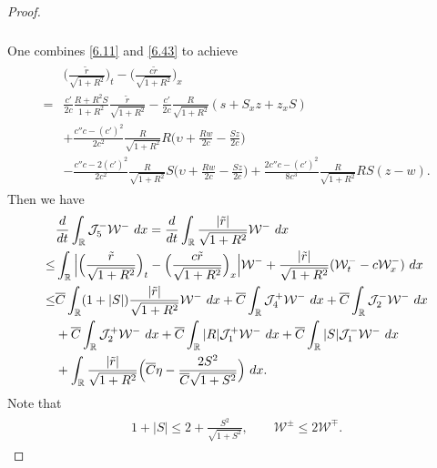 \documentclass[10pt,a4paper]{amsart}
\newcommand{\fr}{\frac}
\begin{document}
\begin{proof}
\begin{align}
\begin{split}
\end{split}
\end{align}
One combines \eqref{6.11} and \eqref{6.43} to achieve
\begin{align}\label{6.44}
\begin{split}
&\Big(\fr{\tilde{r}}{\sqrt{1+R^2}}\Big)_t-\Big(\fr{c\tilde{r}}{\sqrt{1+R^2}}\Big)_x \\
=&\fr{c'}{2c}\fr{R+R^2S}{1+R^2}\fr{\tilde{r}}{\sqrt{1+R^2}} -\fr{c'}{2c}\fr{R}{\sqrt{1+R^2}}(s +S_xz+z_xS ) \\ &+\fr{c''c-(c')^2}{2c^2}\fr{R}{\sqrt{1+R^2}}R\Big(\upsilon+\fr{Rw}{2c}-\fr{Sz}{2c}\Big) \\ &-\fr{c''c-2(c')^2}{2c^2}\fr{R}{\sqrt{1+R^2}}S\Big(\upsilon+\fr{Rw}{2c}-\fr{Sz}{2c}\Big) +\fr{2c''c-(c')^2}{8c^3}\fr{R}{\sqrt{1+R^2}}RS(z-w).
\end{split}
\end{align}
Then we have
\begin{align}\label{6.45}
\begin{split}
&\fr{{\rm d}}{{\rm d}t}\int_{\mathbb{R}} \mathcal{J}_{5}^-\mathcal{W}^-\ {\rm d}x=\fr{{\rm d}}{{\rm d}t}\int_{\mathbb{R}}\fr{|\tilde{r}|}{\sqrt{1+R^2}}\mathcal{W}^-\ {\rm d}x \\
\leq &\int_{\mathbb{R}}\Big|\Big(\fr{\tilde{r}}{\sqrt{1+R^2}}\Big)_t -\Big(\fr{c\tilde{r}}{\sqrt{1+R^2}}\Big)_x\Big|\mathcal{W}^- +\fr{|\tilde{r}|}{\sqrt{1+R^2}}(\mathcal{W}^{-}_t-c\mathcal{W}^{-}_x)\ {\rm d}x \\
\leq &\overline{C}\int_{\mathbb{R}} (1+|S|)\fr{|\tilde{r}|}{\sqrt{1+R^2}} \mathcal{W}^-\ {\rm d}x +\overline{C}\int_{\mathbb{R}}  \mathcal{J}_{4}^+\mathcal{W}^-\ {\rm d}x +\overline{C}\int_{\mathbb{R}}  \mathcal{J}_{2}^-\mathcal{W}^-\ {\rm d}x \\ & +\overline{C}\int_{\mathbb{R}}  \mathcal{J}_{2}^+\mathcal{W}^-\ {\rm d}x +\overline{C}\int_{\mathbb{R}}  |R|\mathcal{J}_{1}^+\mathcal{W}^-\ {\rm d}x
+\overline{C}\int_{\mathbb{R}}  |S|\mathcal{J}_{1}^-\mathcal{W}^-\ {\rm d}x \\
&+\int_{\mathbb{R}} \fr{|\tilde{r}|}{\sqrt{1+R^2}}\Big(\overline{C}\eta-\fr{2S^2}{\overline{C}\sqrt{1+S^2}}\Big)\ {\rm d}x.
\end{split}
\end{align}
Note that
\begin{align*}
\begin{split}
1+|S|\leq 2+\fr{S^2}{\sqrt{1+S^2}},\qquad \mathcal{W}^\pm\leq 2\mathcal{W}^\mp.
\end{split}
\end{align*}

\end{proof}
\end{document}

